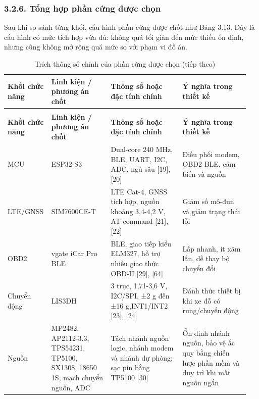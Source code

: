 \documentclass[a4paper]{extarticle}
\newcommand{\thesisterm}[1]{{\rmfamily #1}}
\newcommand{\thesissettableid}[2]{%
  \renewcommand{\thetable}{#1}%
  \renewcommand{\theHtable}{#2}%
}
\begin{document}
\subsubsection{3.2.6. Tổng hợp phần cứng được chọn}\label{tux1ed5ng-hux1ee3p-phux1ea7n-cux1ee9ng-ux111ux1b0ux1ee3c-chux1ecdn}

Sau khi so sánh từng khối, cấu hình phần cứng được chốt như Bảng 3.13. Đây là cấu hình có mức tích hợp vừa đủ: không quá tối giản đến mức thiếu ổn định, nhưng cũng không mở rộng quá mức so với phạm vi đồ án.

{\thesissettableid{3.13}{condensed-bang-3-13-trich-thong-so-chinh-cua-phan-cung-duoc-chon}
\def\LTcaptype{table}
\begin{longtable}{|L{0.145\linewidth}|L{0.240\linewidth}|L{0.292\linewidth}|L{0.273\linewidth}|}
\caption{Trích thông số chính của phần cứng được chọn}\label{tab:condensed-bang-3-13-trich-thong-so-chinh-cua-phan-cung-duoc-chon}\\
\hline
\textbf{Khối chức năng} & \textbf{Linh kiện / phương án chốt} & \textbf{Thông số hoặc đặc tính chính} & \textbf{Ý nghĩa trong thiết kế} \\
\hline
\endfirsthead
\caption[]{Trích thông số chính của phần cứng được chọn (tiếp theo)}\\
\hline
\textbf{Khối chức năng} & \textbf{Linh kiện / phương án chốt} & \textbf{Thông số hoặc đặc tính chính} & \textbf{Ý nghĩa trong thiết kế} \\
\hline
\endhead
\endfoot
\endlastfoot
MCU & ESP32-S3 & Dual-core 240 MHz, BLE, UART, I2C, ADC, ngủ sâu {[}19{]}, {[}20{]} & Điều phối modem, OBD2 BLE, cảm biến và nguồn \\\hline
LTE/GNSS & SIM7600CE-T & LTE Cat-4, GNSS tích hợp, nguồn khoảng 3,4-4,2 V, AT command {[}21{]}, {[}22{]} & Giảm số mô-đun và giảm trạng thái lỗi \\\hline
OBD2 & vgate iCar Pro BLE & BLE, giao tiếp kiểu ELM327, hỗ trợ nhiều giao thức OBD-II {[}29{]}, {[}64{]} & Lắp nhanh, ít xâm lấn, dễ thay bộ chuyển đổi \\\hline
Chuyển động & LIS3DH & 3 trục, 1,71-3,6 V, I2C/SPI, ±2 g đến ±16 g,\thesisterm{INT1/INT2} {[}23{]}, {[}24{]} & Đánh thức thiết bị khi xe đỗ có rung/chuyển động \\\hline
Nguồn & MP2482, AP2112-3.3, TPS54231, TP5100, SX1308, 18650 1S, mạch chuyển nguồn, ADC & Tách nhánh nguồn logic, nhánh modem và nhánh dự phòng; sạc pin bằng TP5100 {[}30{]} & Ổn định nhánh nguồn, bảo vệ ắc quy bằng chiến lược phần mềm và duy trì khi mất nguồn ngắn \\\hline
\end{longtable}
}
\end{document}
